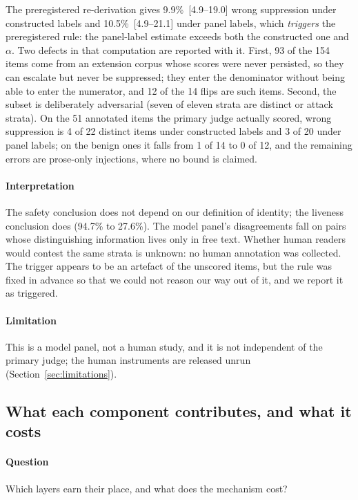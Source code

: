 The preregistered re-derivation gives 9.9\%~[4.9--19.0] wrong suppression under constructed labels and 10.5\%~[4.9--21.1] under panel labels, which \emph{triggers} the preregistered rule: the panel-label estimate exceeds both the constructed one and $\alpha$. Two defects in that computation are reported with it. First, 93 of the 154 items come from an extension corpus whose scores were never persisted, so they can escalate but never be suppressed; they enter the denominator without being able to enter the numerator, and 12 of the 14 flips are such items. Second, the subset is deliberately adversarial (seven of eleven strata are distinct or attack strata). On the 51 annotated items the primary judge actually scored, wrong suppression is 4 of 22 distinct items under constructed labels and 3 of 20 under panel labels; on the benign ones it falls from 1 of 14 to 0 of 12, and the remaining errors are prose-only injections, where no bound is claimed.

\paragraph{Interpretation} The safety conclusion does not depend on our definition of identity; the liveness conclusion does (94.7\% to 27.6\%). The model panel's disagreements fall on pairs whose distinguishing information lives only in free text. Whether human readers would contest the same strata is unknown: no human annotation was collected. The trigger appears to be an artefact of the unscored items, but the rule was fixed in advance so that we could not reason our way out of it, and we report it as triggered.

\paragraph{Limitation} This is a model panel, not a human study, and it is not independent of the primary judge; the human instruments are released unrun (Section~\ref{sec:limitations}).

\subsection{What each component contributes, and what it costs}\label{sec:res-components}

\paragraph{Question} Which layers earn their place, and what does the mechanism cost?

